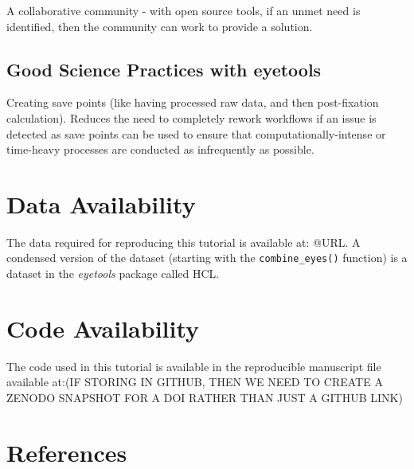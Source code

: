 \documentclass[
  man,
  floatsintext,
  longtable,
  nolmodern,
  notxfonts,
  notimes,
  colorlinks=true,linkcolor=blue,citecolor=blue,urlcolor=blue]{apa7}
\begin{document}
A collaborative community - with open source tools, if an unmet need is
identified, then the community can work to provide a solution.

\subsection{Good Science Practices with
eyetools}\label{good-science-practices-with-eyetools}

Creating save points (like having processed raw data, and then
post-fixation calculation). Reduces the need to completely rework
workflows if an issue is detected as save points can be used to ensure
that computationally-intense or time-heavy processes are conducted as
infrequently as possible.

\section{Data Availability}\label{data-availability}

The data required for reproducing this tutorial is available at: @URL. A
condensed version of the dataset (starting with the
\texttt{combine\_eyes()} function) is a dataset in the \emph{eyetools}
package called HCL.

\section{Code Availability}\label{code-availability}

The code used in this tutorial is available in the reproducible
manuscript file available at:(IF STORING IN GITHUB, THEN WE NEED TO
CREATE A ZENODO SNAPSHOT FOR A DOI RATHER THAN JUST A GITHUB LINK)

\section{References}\label{references}
\end{document}
